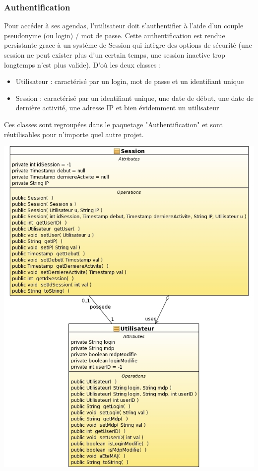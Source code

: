\documentclass[12pt , a4paper]{article}
\begin{document}
\subsubsection{Authentification}
\noindent Pour accéder à ses agendas, l'utilisateur  doit s'authentifier à l'aide d'un couple pseudonyme (ou login) / mot de passe. Cette authentification  est rendue persistante grace à un système de
Session qui intègre des options de sécurité (une session ne peut exister plus d'un certain temps, une session inactive trop longtemps n'est plus valide).
D'où les deux classes :
\begin{itemize}
\item Utilisateur : caractérisé par un login, mot de passe et un identifiant unique
\item Session : caractérisé par un identifiant unique, une date de début, une date de dernière activité, une adresse IP et bien évidemment un utilisateur
\end{itemize}
\noindent Ces classes sont regroupées dans le paquetage "Authentification" et sont réutilisables pour n'importe quel autre projet.

\begin{center}
  \includegraphics[scale=0.5]{./images/class_diagram_authentification.jpg}
\end{center}
\end{document}
